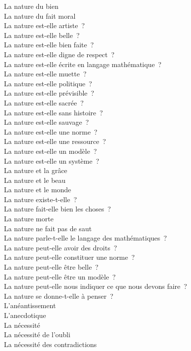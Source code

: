 \documentclass[a4paper,12pt]{article}
\begin{document}
La nature du bien \\
La nature du fait moral \\
La nature est-elle artiste ? \\
La nature est-elle belle ? \\
La nature est-elle bien faite ? \\
La nature est-elle digne de respect ? \\
La nature est-elle écrite en langage mathématique ? \\
La nature est-elle muette ? \\
La nature est-elle politique ? \\
La nature est-elle prévisible ? \\
La nature est-elle sacrée ? \\
La nature est-elle sans histoire ? \\
La nature est-elle sauvage ? \\
La nature est-elle une norme ? \\
La nature est-elle une ressource ? \\
La nature est-elle un modèle ? \\
La nature est-elle un système ? \\
La nature et la grâce \\
La nature et le beau \\
La nature et le monde \\
La nature existe-t-elle ? \\
La nature fait-elle bien les choses ? \\
La nature morte \\
La nature ne fait pas de saut \\
La nature parle-t-elle le langage des mathématiques ? \\
La nature peut-elle avoir des droits ? \\
La nature peut-elle constituer une norme ? \\
La nature peut-elle être belle ? \\
La nature peut-elle être un modèle ? \\
La nature peut-elle nous indiquer ce que nous devons faire ? \\
La nature se donne-t-elle à penser ? \\
L'anéantissement \\
L'anecdotique \\
La nécessité \\
La nécessité de l'oubli \\
La nécessité des contradictions \\
\end{document}
